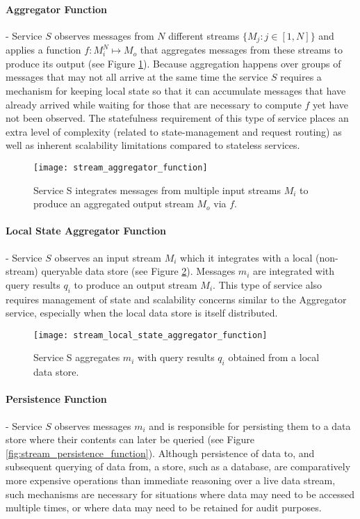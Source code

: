 \paragraph{Aggregator Function} - Service $S$ observes messages from $N$ different streams $\{M_j: j \in [1,N]\}$ and applies a function $f:M_i^N \mapsto M_o$ that aggregates messages from these streams to produce its output (see Figure \ref{fig:stream_aggregator_function}). Because aggregation happens over groups of messages that may not all arrive at the same time the service $S$ requires a mechanism for keeping local state so that it can accumulate messages that have already arrived while waiting for those that are necessary to compute $f$ yet have not been observed. The statefulness requirement of this type of service places an extra level of complexity (related to state-management and request routing) as well as inherent scalability limitations compared to stateless services\autocite{oppenheimer2002architecture}.

\begin{figure}[H]
\texttt{[image: stream\_aggregator\_function]}
\centering
\caption {Service S integrates messages from multiple input streams $M_i$ to produce an aggregated output stream $M_o$ via $f$.}
\label{fig:stream_aggregator_function}
\end{figure}


\paragraph{Local State Aggregator Function} - Service $S$ observes an input stream $M_i$ which it integrates with a local (non-stream) queryable data store (see Figure \ref{fig:stream_local_state_aggregator_function}). Messages $m_i$ are integrated with query results $q_i$ to produce an output stream $M_i$. This type of service also requires management of state and scalability concerns similar to the Aggregator service, especially when the local data store is itself distributed. 

\begin{figure}[H]
\texttt{[image: stream\_local\_state\_aggregator\_function]}
\centering
\caption {Service S aggregates $m_i$ with query results $q_i$ obtained from a local data store.}
\label{fig:stream_local_state_aggregator_function}
\end{figure}


\paragraph{Persistence Function} - Service $S$ observes messages $m_i$ and is responsible for persisting them to a data store where their contents can later be queried (see Figure \ref{fig:stream_persistence_function}). Although persistence of data to, and subsequent querying of data from, a store, such as a database, are comparatively more expensive operations than immediate reasoning over a live data stream, such mechanisms are necessary for situations where data may need to be accessed multiple times, or where data may need to be retained for audit purposes.

